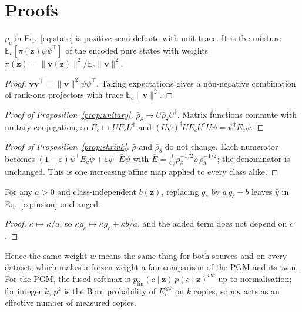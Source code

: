 \section{Proofs}
\label{app:proofs}

\begin{proposition}
$\rho_c$ in Eq.~\eqref{eq:state} is positive semi-definite with unit trace. It
is the mixture $\mathbb E_c[\pi(\mathbf z)\psi\psi^{\top}]$ of the encoded pure
states with weights $\pi(\mathbf z)=\|\mathbf v(\mathbf z)\|^2/\mathbb E_c\|\mathbf v\|^2$.
\end{proposition}
\begin{proof}
$\mathbf v\mathbf v^{\top}=\|\mathbf v\|^2\psi\psi^{\top}$. Taking expectations
gives a non-negative combination of rank-one projectors with trace
$\mathbb E_c\|\mathbf v\|^2$.
\end{proof}

\begin{proof}[Proof of Proposition~\ref{prop:unitary}]
$\bar\rho_\delta\mapsto U\bar\rho_\delta U^{\dagger}$. Matrix functions commute
with unitary conjugation, so $E_c\mapsto UE_cU^{\dagger}$ and
$(U\psi)^{\dagger}UE_cU^{\dagger}U\psi=\psi^{\dagger}E_c\psi$.
\end{proof}

\begin{proof}[Proof of Proposition~\ref{prop:shrink}]
$\bar\rho$ and $\bar\rho_\delta$ do not change. Each numerator becomes
$(1-\varepsilon)\psi^{\top}E_c\psi+\varepsilon\psi^{\top}\bar E\psi$ with
$\bar E=\frac1{C_t}\bar\rho_\delta^{-1/2}\bar\rho\,\bar\rho_\delta^{-1/2}$; the
denominator is unchanged. This is one increasing affine map applied to every
class alike.
\end{proof}

\begin{proposition}
For any $a>0$ and class-independent $b(\mathbf z)$, replacing $g_c$ by $a\,g_c+b$
leaves $\hat y$ in Eq.~\eqref{eq:fusion} unchanged.
\end{proposition}
\begin{proof}
$\kappa\mapsto\kappa/a$, so $\kappa g_c\mapsto\kappa g_c+\kappa b/a$, and the added
term does not depend on $c$.
\end{proof}
\noindent Hence the same weight $w$ means the same thing for both sources and on
every dataset, which makes a frozen weight a fair comparison of the PGM and its
twin. For the PGM, the fused softmax is $p_{\mathrm{lin}}(c\mid\mathbf z)\,p(c\mid\mathbf z)^{w\kappa}$
up to normalisation; for integer $k$, $p^k$ is the Born probability of
$E_c^{\otimes k}$ on $k$ copies, so $w\kappa$ acts as an effective number of
measured copies.

